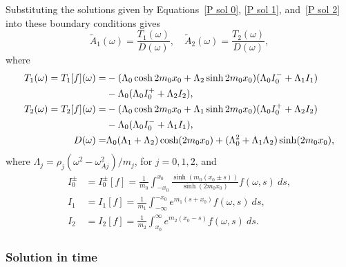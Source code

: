 \documentclass[12pt, draft]{../style-files/ociamthesis}
\begin{document}
Substituting the solutions given by Equations~\eqref{P sol 0}, \eqref{P sol 1}, and~\eqref{P sol 2} into these boundary conditions gives
\begin{equation}
\tilde{A}_1(\omega) = \frac{T_1(\omega)}{D(\omega)}, \quad \tilde{A}_2(\omega) = \frac{T_2(\omega)}{D(\omega)},
\end{equation}
where
\begin{align}
T_1(\omega) = T_1[f](\omega) = & -(\Lambda_0\cosh{2m_0 x_0} + \Lambda_2\sinh{2m_0 x_0})(\Lambda_0 I_0^- + \Lambda_1 I_1) \notag \\
& - \Lambda_0(\Lambda_0 I_0^+ + \Lambda_2 I_2), \\
T_2(\omega) = T_2[f](\omega) = & - (\Lambda_0\cosh{2m_0 x_0} + \Lambda_1\sinh{2m_0 x_0})(\Lambda_0 I_0^+ + \Lambda_2 I_2) \notag \\
& -\Lambda_0(\Lambda_0 I_0^- + \Lambda_1 I_1), \\
D(\omega) = & \Lambda_0(\Lambda_1 + \Lambda_2)\cosh(2m_0x_0) + (\Lambda_0^2 + \Lambda_1\Lambda_2)\sinh(2m_0x_0),
\label{D}
\end{align}
where $\Lambda_j = \rho_j (\omega^2 - \omega_{Aj}^2) /  m_j$, for $j = 0, 1, 2$, and
\begin{align}
I_0^\pm &= I_0^\pm[f] = \frac{1}{m_0} \int_{-x_0}^{x_0} \frac{\sinh(m_0(x_0 \pm s))}{\sinh(2m_0x_0)} f(\omega, s) ~ds, \\
I_1 &= I_1[f] = \frac{1}{m_1} \int_{-\infty}^{-x_0} e^{m_1(s + x_0)} f(\omega, s) ~ds, \\
I_2 &= I_2[f] = \frac{1}{m_2} \int_{x_0}^\infty e^{m_2(x_0 - s)} f(\omega, s) ~ds.
\end{align}


\subsubsection{Solution in time}
\end{document}
